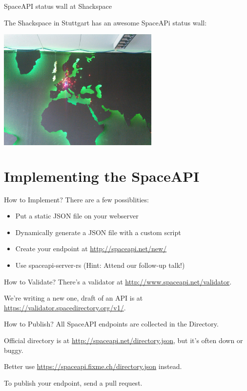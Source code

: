 \begin{frame}{SpaceAPI status wall at Shackspace}

	The Shackspace in Stuttgart has an awesome SpaceAPi status wall:
	
	\vspace{1em}
	\centerline{
		\includegraphics[width=0.6\textwidth]{what_is_the_spaceapi/statuswall.jpg}
	}

\end{frame}




\section{Implementing the SpaceAPI}

\begin{frame}{How to Implement?}
	There are a few possiblities:
	\pause
	\begin{itemize}
		\item Put a static JSON file on your webserver	
		\pause
		\item Dynamically generate a JSON file with a custom script
		\pause
		\item Create your endpoint at \url{http://spaceapi.net/new/}
		\pause
		\item Use spaceapi-server-rs (Hint: Attend our follow-up talk!)
	\end{itemize}
\end{frame}

\begin{frame}{How to Validate?}
	There's a validator at \url{http://www.spaceapi.net/validator}.

	We're writing a new one, draft of an API is at
	\url{https://validator.spacedirectory.org/v1/}.
\end{frame}

\begin{frame}{How to Publish?}
	All SpaceAPI endpoints are collected in the Directory.

	Official directory is at \url{http://spaceapi.net/directory.json}, but it's
	often down or buggy.

	Better use \url{https://spaceapi.fixme.ch/directory.json} instead.

	To publish your endpoint, send a pull request.
\end{frame}


